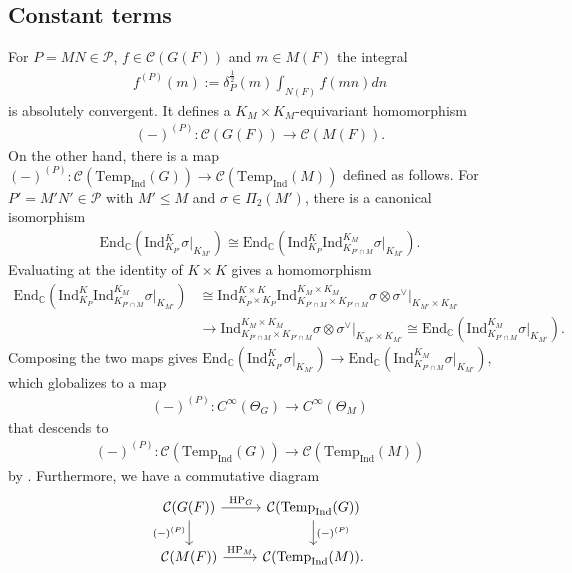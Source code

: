 \documentclass[10pt]{amsart}
\theoremstyle{definition}
\numberwithin{equation}{section}
\numberwithin{equation}{subsection}
\newcommand{\Ind}{\mathrm{Ind}}
\newcommand{\Temp}{\mathrm{Temp}}
\newcommand{\HP}{\mathop{\mathrm{HP}}\nolimits}
\begin{document}
\subsection{Constant terms}\label{ssec:constant} For $P=MN\in \mathcal{P}$, $f\in \mathcal{C}(G(F))$ and $m\in M(F)$ the integral
\begin{align*}
    f^{(P)}(m) := \delta_P^{\frac{1}{2}}(m) \int_{N(F)} f(mn) dn 
\end{align*}
is absolutely convergent. It defines a $K_M\times K_M$-equivariant  homomorphism 
\begin{align*}
    (-)^{(P)}:\mathcal{C}(G(F))\to \mathcal{C}(M(F)).
\end{align*}
On the other hand, there is a map $(-)^{(P)}:\mathcal{C}(\Temp_\Ind(G))\to \mathcal{C}(\Temp_\Ind(M))$ defined as follows. For $P'=M'N'\in \mathcal{P}$ with $M'\le M$ and $\sigma\in\Pi_2(M')$, there is a canonical isomorphism
\begin{align*}
    \mathrm{End}_\mathbb{C}(\Ind_{K_{P'}}^K\sigma\vert_{K_{M'}}) \cong \mathrm{End}_{\mathbb{C}}(\Ind_{K_{P}}^K\Ind^{K_{M}}_{K_{P'\cap M}}\sigma\vert_{K_{M'}}).
\end{align*}
Evaluating at the identity of $K\times K$ gives a homomorphism
\begin{align*}
    \mathrm{End}_{\mathbb{C}}(\Ind_{K_{P}}^K\Ind^{K_{M}}_{K_{P'\cap M}}\sigma\vert_{K_{M'}}) &\cong \Ind_{K_{P}\times K_{P}}^{K\times K}\Ind^{K_{M}\times K_{M}}_{K_{P'\cap M}\times K_{P'\cap M}}\sigma\otimes\sigma^\vee\vert_{K_{M'}\times K_{M'}} \\
    &\to \Ind^{K_{M}\times K_{M}}_{K_{P'\cap M}\times K_{P'\cap M}}\sigma\otimes\sigma^\vee\vert_{K_{M'}\times K_{M'}} \cong \mathrm{End}_{\mathbb{C}}(\Ind^{K_{M}}_{K_{P'\cap M}}\sigma\vert_{K_{M'}}).
\end{align*}
Composing the two maps gives $\mathrm{End}_\mathbb{C}(\Ind_{K_{P'}}^K\sigma\vert_{K_{M'}}) \to \mathrm{End}_{\mathbb{C}}(\Ind^{K_{M}}_{K_{P'\cap M}}\sigma\vert_{K_{M'}})$, which globalizes to a map
\begin{align*}
    (-)^{(P)}:C^\infty(\Theta_G)\to C^\infty(\Theta_M)
\end{align*}
that descends to
\begin{align*}
    (-)^{(P)}:\mathcal{C}(\Temp_\Ind(G))\to \mathcal{C}(\Temp_\Ind(M))
\end{align*}
by {\cite[Lemma 2.14]{DRS}}. Furthermore, we have a commutative diagram
\begin{equation}\label{CT:spectral}
    \begin{tikzcd}
        \mathcal{C}(G(F))\arrow[d,swap,"(-)^{(P)}"]\arrow[r,"\HP_G"]&\mathcal{C}(\Temp_\Ind(G))\arrow[d,"(-)^{(P)}"]\\
        \mathcal{C}(M(F))\arrow[r,"\HP_M"]&\mathcal{C}(\Temp_\Ind(M)).
    \end{tikzcd}
\end{equation}
\end{document}
